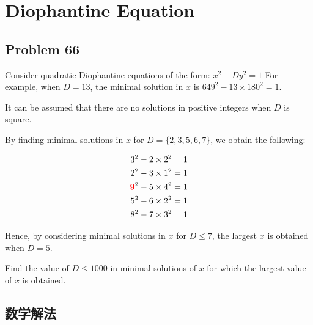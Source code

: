 \section{Diophantine Equation}
\subsection{Problem 66}
Consider quadratic Diophantine equations of the form:
$x^2 - Dy^2 = 1$
For example, when $D=13$, the minimal solution in $x$ is $649^2 - 13 \times 180^2 = 1$.

It can be assumed that there are no solutions in positive integers when $D$ is square.

By finding minimal solutions in $x$ for $D = \{2, 3, 5, 6, 7\}$, we obtain the following:

\begin{align*}
	3^2 - 2 \times 2^2                        & = 1 \\
	2^2 - 3 \times 1^2                        & = 1 \\
	{\color{red}{\mathbf 9}}^2 - 5 \times 4^2 & = 1 \\
	5^2 - 6 \times 2^2                        & = 1 \\
	8^2 - 7 \times 3^2                        & = 1
\end{align*}

Hence, by considering minimal solutions in
$x$ for $D \le 7$, the largest $x$ is obtained when $D = 5$.

Find the value of $D \le 1000$ in minimal solutions of $x$ for which the largest value of $x$ is obtained.

\subsection{数学解法}
